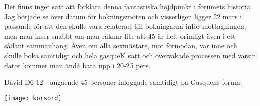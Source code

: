 \documentclass[11pt, a4paper]{memoir} %
\begin{document}
\epigraph{Det finns inget sätt att förklara denna fantastiska höjdpunkt i forumets historia. Jag började se över datum för bokningsmöten och visserligen ligger 22 mars i passande för att den skulle vara relaterad till bokningarna inför mottagningen, men man inser snabbt om man räknar lite att 45 är helt orimligt även i ett sådant sammanhang. Även om alla sexmästare, mot förmodan, var inne och skulle boka samtidigt och hela gasqueK satt och övervakade processen med varsin dator kommer man ändå bara upp i 20-25 pers.}{David D6-12 - angående 45 personer inloggade samtidigt på Gasquens forum.}

\newpage
\restoregeometry
\onecolumn

\centering
    \texttt{[image: korsord]}

\normalsize
\newpage
{}
\twocolumn



\settowidth{\versewidth}{Och tungan lådde vid skepparns gom} %
\end{document}
